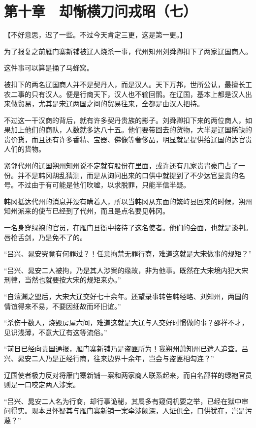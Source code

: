 \section{第十章　却惭横刀问戎昭（七）}

【不好意思，迟了一些。不过今天肯定三更，这是第一更。】

为了报复之前雁门寨新铺被辽人烧杀一事，代州知州刘舜卿扣下了两家辽国商人。

这件事可以算是捅了马蜂窝。

被扣下的两名辽国商人并不是契丹人，而是汉人。天下万邦，世所公认，最擅长工农二事的只有汉人。便是行商天下，汉人也不输回鹘。在辽国，基本上都是汉人出来做贸易，尤其是宋辽两国之间的贸易往来，全都是由汉人把持。

不过这一干汉商的背后，就有许多契丹贵族的影子。刘舜卿扣下来的两位商人，如果加上他们的商队，人数就多达八十五。他们要带回去的货物，大半是辽国稀缺的贵价货，而且还有许多香精、宝器、佛像等奢侈品，明显就是提供给辽国的达官贵人们的货物。

紧邻代州的辽国朔州知州说不定就有股份在里面，或许还有几家贵胄豪门占了一份。并不是韩冈胡乱猜测，而是从询问出来的口供中就提到了不少达官显贵的名号。不过由于有可能是他们吹嘘，以求脱罪，只能半信半疑。

韩冈抵达代州的消息并没有瞒着人，所以当韩冈从东面的繁峙县回来的时候，朔州知州派来的使节已经到了代州，而且是点名要见韩冈。

一名身穿绿袍的官员，在雁门县衙中接待了这名使者。他们的会面，也就是谈判。唇枪舌剑，乃是免不了的。

“吕兴、晁安究竟有何罪过？！任意拘禁无罪行商，难道这就是大宋做事的规矩？”

“吕兴、晁安二人被拘，乃是其人涉案的缘故，非为他事。既然在大宋境内犯大宋刑律，当然也就要按大宋的规矩来办。”

“自澶渊之盟后，大宋大辽交好七十余年。还望录事转告韩经略、刘知州，两国的情谊得来不易，不要因细故而坏旧谊。”

“杀伤十数人，烧毁房屋六间，难道这就是大辽与人交好时惯做的事？邵祥不才，见识浅薄，不意大辽有这等流俗。”

“前日已经向贵国通报，雁门寨新铺乃是盗匪所为！我朔州萧知州已遣人追查。吕兴、晁安二人乃是正经行商，往来边界十余年，岂会与盗匪相勾连？”

辽国使者极力反对将雁门寨新铺一案和两家商人联系起来，而自名邵祥的绿袍官员则是一口咬定两人涉案。

“吕兴、晁安二人名为行商，却行事诡秘，其属多有窥伺机要之举，已经在狱中审问得实。现本县怀疑其与雁门寨新铺一案牵涉颇深，人证俱全，口供犹在，岂是污蔑？”

